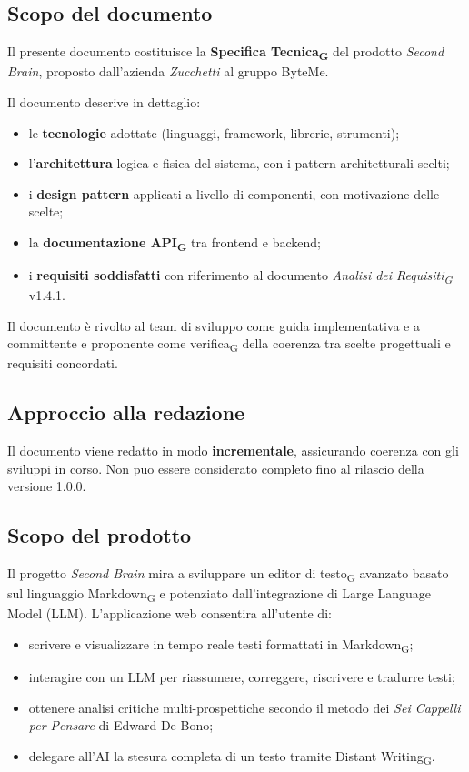 \documentclass[11pt,a4paper]{article}
\newcommand{\gls}[1]{#1\textsubscript{G}}
\begin{document}
\subsection{Scopo del documento}
Il presente documento costituisce la \textbf{\gls{Specifica Tecnica}} del prodotto
\textit{Second Brain}, proposto dall'azienda \textit{Zucchetti} al
gruppo ByteMe.
 
Il documento descrive in dettaglio:
\begin{itemize}
  \item le \textbf{tecnologie} adottate (linguaggi, framework, librerie, strumenti);
  \item l'\textbf{architettura} logica e fisica del sistema, con i pattern architetturali scelti;
  \item i \textbf{design pattern} applicati a livello di componenti, con motivazione delle scelte;
  \item la \textbf{documentazione \gls{API}} tra frontend e backend;
  \item i \textbf{requisiti soddisfatti} con riferimento al documento \textit{\gls{Analisi dei Requisiti}} v1.4.1.
\end{itemize}
 
Il documento è rivolto al team di sviluppo come guida implementativa e a
committente e proponente come \gls{verifica} della coerenza tra scelte progettuali e requisiti concordati.
 
\subsection{Approccio alla redazione}
Il documento viene redatto in modo \textbf{incrementale}, assicurando coerenza con gli sviluppi in corso. Non puo essere considerato completo fino al rilascio della versione 1.0.0.

\subsection{Scopo del prodotto}
Il progetto \textit{Second Brain} mira a sviluppare un \gls{editor di testo} avanzato basato sul linguaggio \gls{Markdown} e potenziato dall'integrazione di Large Language Model (LLM).
L'applicazione web consentira all'utente di:
\begin{itemize}
  \item scrivere e visualizzare in tempo reale testi formattati in \gls{Markdown};
  \item interagire con un LLM per riassumere, correggere, riscrivere e tradurre testi;
  \item ottenere analisi critiche multi-prospettiche secondo il metodo dei \textit{Sei Cappelli per Pensare} di Edward De Bono;
  \item delegare all'AI la stesura completa di un testo tramite \gls{Distant Writing}.
\end{itemize}
 
\end{document}
